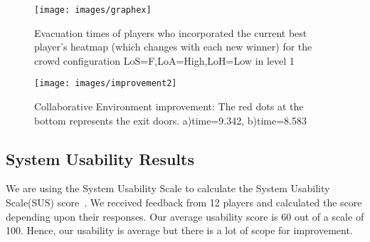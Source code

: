 \begin{figure} 
\centering
\texttt{[image: images/graphex]}
  \caption{\label{fig:codesign-incremental-improvement}Evacuation times of players who incorporated the current best player's  heatmap (which changes with each new winner) for the crowd configuration LoS=F,LoA=High,LoH=Low in level 1}
\end{figure}

\begin{figure}
\centering
	\texttt{[image: images/improvement2]}
	\caption{\label{fig:codesign-heatmap-changes}Collaborative Environment improvement: The red dots at the bottom represents the exit doors. a)time=9.342, b)time=8.583}
\end{figure}

\subsection{System Usability Results}
We are using the System Usability Scale to calculate the System Usability Scale(SUS) score~\cite{JBrookeSUS}. We received feedback from 12 players and calculated the score depending upon their responses. Our average usability score is 60 out of a scale of 100. Hence, our usability is average but there is a lot of scope for improvement. 








